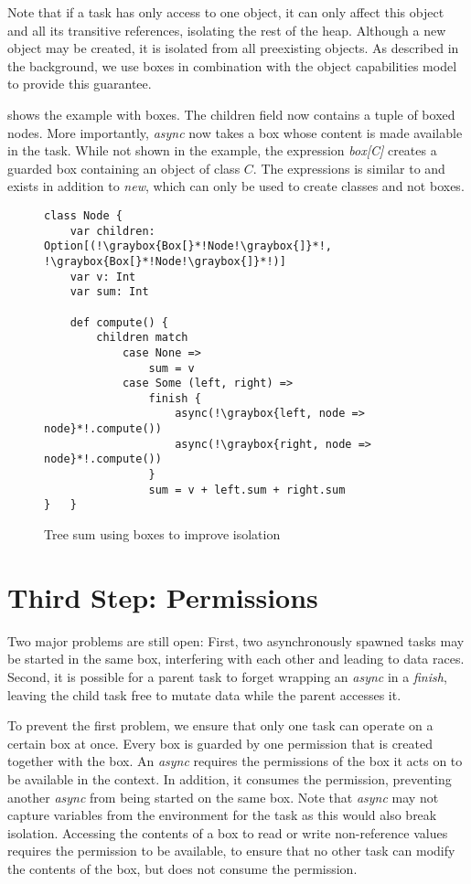Note that if a task has only access to one object, it can only affect this object and all its transitive references, isolating the rest of the heap. Although a new object may be created, it is isolated from all preexisting objects. As described in the background, we use boxes in combination with the object capabilities model to provide this guarantee.

 shows the example with boxes. The children field now contains a tuple of boxed nodes. More importantly, \textit{async} now takes a box whose content is made available in the task. While not shown in the example, the expression \textit{box[C]} creates a guarded box containing an object of class $C$. The expressions is similar to and exists in addition to \textit{new}, which can only be used to create classes and not boxes.

\begin{figure}
\begin{lstlisting}
class Node {
	var children: Option[(!\graybox{Box[}*!Node!\graybox{]}*!, !\graybox{Box[}*!Node!\graybox{]}*!)]
	var v: Int
	var sum: Int

	def compute() {
		children match
			case None =>
				sum = v
			case Some (left, right) =>
				finish {
					async(!\graybox{left, node => node}*!.compute())
					async(!\graybox{right, node => node}*!.compute())
				}
				sum = v + left.sum + right.sum
}	}
\end{lstlisting}
    \caption{Tree sum using boxes to improve isolation}
    \label{fig:sum-boxes}
\end{figure}

\section{Third Step: Permissions}
Two major problems are still open: First, two asynchronously spawned tasks may be started in the same box, interfering with each other and leading to data races. Second, it is possible for a parent task to forget wrapping an \textit{async} in a \textit{finish}, leaving the child task free to mutate data while the parent accesses it.

To prevent the first problem, we ensure that only one task can operate on a certain box at once. Every box is guarded by one permission that is created together with the box. An \textit{async} requires the permissions of the box it acts on to be available in the context. In addition, it consumes the permission, preventing another \textit{async} from being started on the same box. Note that \textit{async} may not capture variables from the environment for the task as this would also break isolation. Accessing the contents of a box to read or write non-reference values requires the permission to be available, to ensure that no other task can modify the contents of the box, but does not consume the permission.

